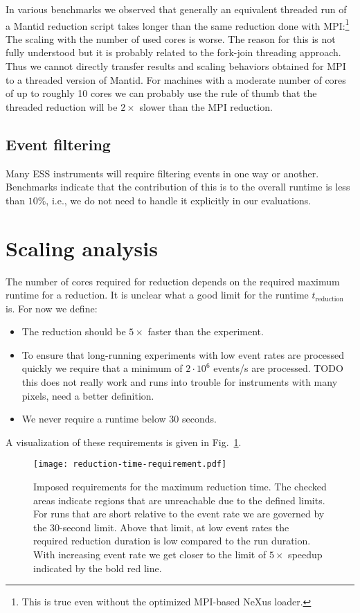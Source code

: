 \documentclass[a4paper,english,numbers=noenddot,bibliography=totoc,chapterprefix=on,DIV=12]{scrartcl}
\newcommand{\Treduction}{t_{\text{reduction}}}
\begin{document}
In various benchmarks we observed that generally an equivalent threaded run of a Mantid reduction script takes longer than the same reduction done with MPI:\footnote{This is true even without the optimized MPI-based NeXus loader.}
The scaling with the number of used cores is worse.
The reason for this is not fully understood but it is probably related to the fork-join threading approach.
Thus we cannot directly transfer results and scaling behaviors obtained for MPI to a threaded version of Mantid.
For machines with a moderate number of cores of up to roughly 10 cores we can probably use the rule of thumb that the threaded reduction will be $2\times$ slower than the MPI reduction.

\subsection{Event filtering}

Many ESS instruments will require filtering events in one way or another.
Benchmarks indicate that the contribution of this is to the overall runtime is less than $10\%$, i.e., we do not need to handle it explicitly in our evaluations.


\section{Scaling analysis}

The number of cores required for reduction depends on the required maximum runtime for a reduction.
It is unclear what a good limit for the runtime $\Treduction$ is.
For now we define:

\begin{itemize}
  \item The reduction should be $5\times$ faster than the experiment.
  \item To ensure that long-running experiments with low event rates are processed quickly we require that a minimum of $2\cdot10^6$ events/s are processed. TODO this does not really work and runs into trouble for instruments with many pixels, need a better definition.
  \item We never require a runtime below 30 seconds.
\end{itemize}
A visualization of these requirements is given in Fig.~\ref{fig:reduction-time-requirement}.

\begin{figure}
  \centering
\texttt{[image: reduction-time-requirement.pdf]}
\caption{\label{fig:reduction-time-requirement}Imposed requirements for the maximum reduction time. The checked areas indicate regions that are unreachable due to the defined limits. For runs that are short relative to the event rate we are governed by the 30-second limit. Above that limit, at low event rates the required reduction duration is low compared to the run duration. With increasing event rate we get closer to the limit of $5\times$ speedup indicated by the bold red line.}
\end{figure}
\end{document}
